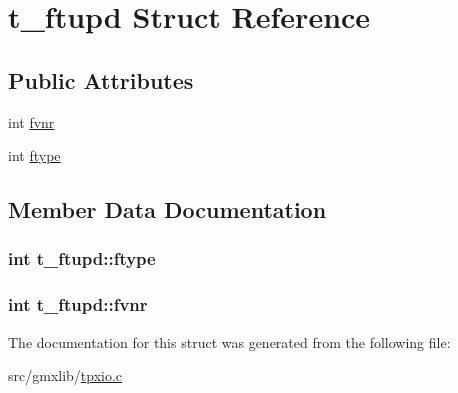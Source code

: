 \hypertarget{structt__ftupd}{\section{t\-\_\-ftupd \-Struct \-Reference}
\label{structt__ftupd}
}
\subsection*{\-Public \-Attributes}
\begin{DoxyCompactItemize}
\item 
int \hyperlink{structt__ftupd_a3b932ee2dc13b83ee7bb5dfe55e887b8}{fvnr}
\item 
int \hyperlink{structt__ftupd_a7cf7723121b5d39872747ad6ac0ba0f1}{ftype}
\end{DoxyCompactItemize}


\subsection{\-Member \-Data \-Documentation}
\hypertarget{structt__ftupd_a7cf7723121b5d39872747ad6ac0ba0f1}{
\subsubsection[{ftype}]{\setlength{\rightskip}{0pt plus 5cm}int {\bf t\-\_\-ftupd\-::ftype}}}\label{structt__ftupd_a7cf7723121b5d39872747ad6ac0ba0f1}
\hypertarget{structt__ftupd_a3b932ee2dc13b83ee7bb5dfe55e887b8}{
\subsubsection[{fvnr}]{\setlength{\rightskip}{0pt plus 5cm}int {\bf t\-\_\-ftupd\-::fvnr}}}\label{structt__ftupd_a3b932ee2dc13b83ee7bb5dfe55e887b8}


\-The documentation for this struct was generated from the following file\-:\begin{DoxyCompactItemize}
\item 
src/gmxlib/\hyperlink{tpxio_8c}{tpxio.\-c}\end{DoxyCompactItemize}

